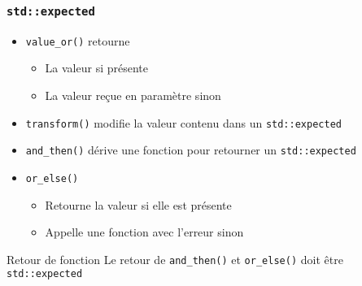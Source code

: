 \documentclass[C++.tex]{subfiles}
\begin{document}
\begin{frame}[fragile]
	\frametitle{\lstinline|std::expected|}
	\begin{itemize}
		\item \lstinline|value_or()| retourne 
		\begin{itemize}
			\item La valeur si présente
			\item La valeur reçue en paramètre sinon
		\end{itemize}
		\item \lstinline|transform()| modifie la valeur contenu dans un \lstinline|std::expected|
		\item \lstinline|and_then()| dérive une fonction pour retourner un \lstinline|std::expected|
		\item \lstinline|or_else()|
		\begin{itemize}
			\item Retourne la valeur si elle est présente
			\item Appelle une fonction avec l'erreur sinon
		\end{itemize}
	\end{itemize}

	\begin{alertblock}{Retour de fonction}
		Le retour de \lstinline|and_then()| et \lstinline|or_else()| doit être  \lstinline|std::expected|
	\end{alertblock}


\end{frame}
\end{document}

